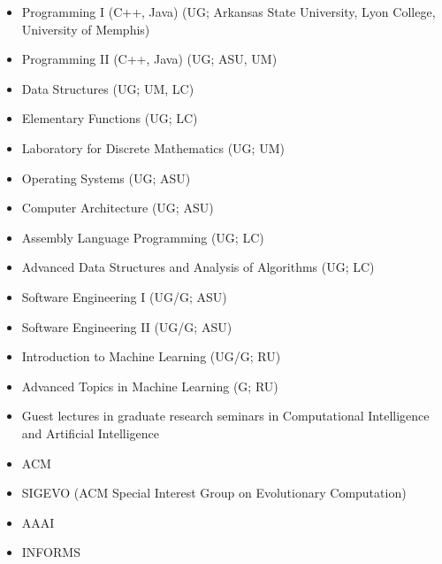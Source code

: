 \documentclass[a4paper,10pt]{cvclean}
\begin{document}
\begin{Courses Taught}
\begin{itemize}
\item Programming I (C++, Java) (UG; Arkansas State University, Lyon College,
  University of Memphis)
\item Programming II (C++, Java) (UG; ASU, UM)
\item Data Structures (UG; UM, LC)
\item Elementary Functions (UG; LC)
\item Laboratory for Discrete Mathematics (UG; UM)
\item Operating Systems (UG; ASU)
\item Computer Architecture (UG; ASU)
\item Assembly Language Programming (UG; LC)
\item Advanced Data Structures and Analysis of Algorithms (UG; LC)
\item Software Engineering I (UG/G; ASU)
\item Software Engineering II (UG/G; ASU)
\item Introduction to Machine Learning (UG/G; RU)
\item Advanced Topics in Machine Learning (G; RU)
\item Guest lectures in graduate research seminars in Computational Intelligence
  and Artificial Intelligence
\end{itemize}
\end{Courses Taught}

\begin{Professional Societies}
\begin{itemize}
\item ACM
\item SIGEVO (ACM Special Interest Group on Evolutionary Computation)
\item AAAI
\item INFORMS
\end{itemize}
\end{Professional Societies}
\end{document}
